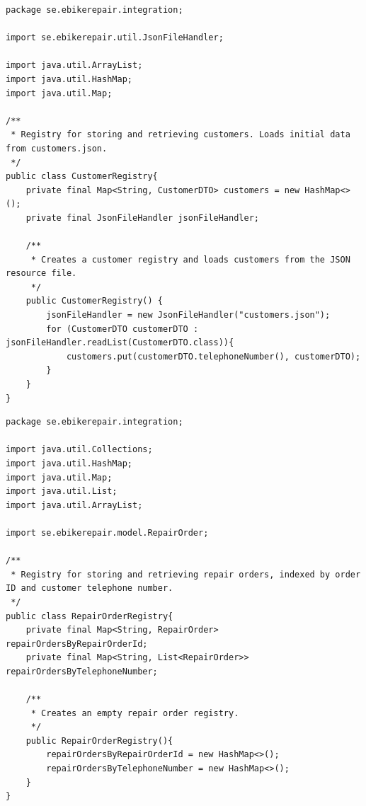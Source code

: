 \documentclass[a4paper]{scrartcl}
\begin{document}
\begin{lstlisting}[style=javastyle, caption={Main class entry point}]
package se.ebikerepair.integration;

import se.ebikerepair.util.JsonFileHandler;

import java.util.ArrayList;
import java.util.HashMap;
import java.util.Map;

/**
 * Registry for storing and retrieving customers. Loads initial data from customers.json.
 */
public class CustomerRegistry{
    private final Map<String, CustomerDTO> customers = new HashMap<>();
    private final JsonFileHandler jsonFileHandler;

    /**
     * Creates a customer registry and loads customers from the JSON resource file.
     */
    public CustomerRegistry() {
        jsonFileHandler = new JsonFileHandler("customers.json");
        for (CustomerDTO customerDTO : jsonFileHandler.readList(CustomerDTO.class)){
            customers.put(customerDTO.telephoneNumber(), customerDTO);
        }
    }
}

\end{lstlisting}

\begin{lstlisting}[style=javastyle, caption={Main class entry point}]
package se.ebikerepair.integration;

import java.util.Collections;
import java.util.HashMap;
import java.util.Map;
import java.util.List;
import java.util.ArrayList;

import se.ebikerepair.model.RepairOrder;

/**
 * Registry for storing and retrieving repair orders, indexed by order ID and customer telephone number.
 */
public class RepairOrderRegistry{
    private final Map<String, RepairOrder> repairOrdersByRepairOrderId;
    private final Map<String, List<RepairOrder>> repairOrdersByTelephoneNumber;

    /**
     * Creates an empty repair order registry.
     */
    public RepairOrderRegistry(){
        repairOrdersByRepairOrderId = new HashMap<>();
        repairOrdersByTelephoneNumber = new HashMap<>();
    }
}

\end{lstlisting}
\end{document}
